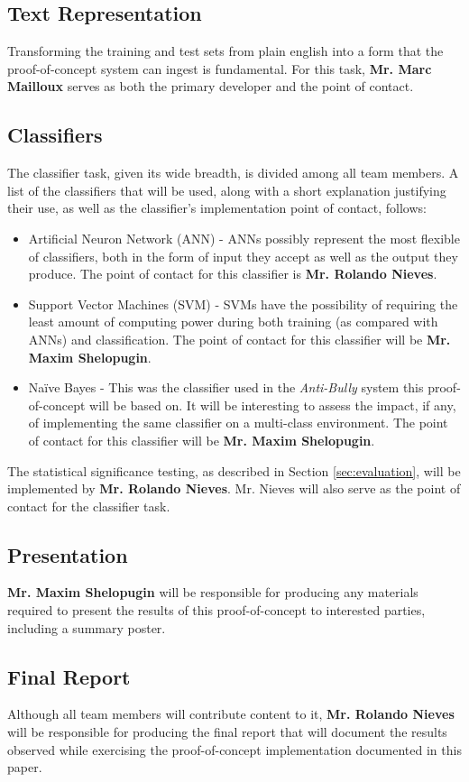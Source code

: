 \documentclass[conference]{sig-alternate-05-2015}
\begin{document}
\subsection{Text Representation}\label{sec:tokenization_task}
Transforming the training and test sets from plain english into a form that the
proof-of-concept system can ingest is fundamental. For this task,
\textbf{Mr. Marc Mailloux} serves as both the primary developer and the
point of contact.

\subsection{Classifiers}\label{sec:classifier_task}
The classifier task, given its wide breadth, is divided among all team
members. A list of the classifiers that will be used, along with a short
explanation justifying their use, as well as the classifier's implementation
point of contact, follows:
\begin{itemize}
  \item Artificial Neuron Network (ANN) - ANNs possibly represent
  the most flexible of classifiers, both in the form of input they accept as
  well as the output they produce. The point of contact for this classifier is
  \textbf{Mr. Rolando Nieves}.
  \item Support Vector Machines (SVM) - SVMs have the possibility of requiring
  the least amount of computing power during both training (as compared with
  ANNs) and classification. The point of contact for this classifier will be
  \textbf{Mr. Maxim Shelopugin}.
  \item Na\"{i}ve Bayes - This was the classifier used in the \textit{Anti-Bully}
  system this proof-of-concept will be based on. It will be interesting to
  assess the impact, if any, of implementing the same classifier on a
  multi-class environment. The point of contact for this classifier will be
  \textbf{Mr. Maxim Shelopugin}.
\end{itemize}

The statistical significance testing, as described in Section
\ref{sec:evaluation}, will be implemented by \textbf{Mr. Rolando Nieves}. Mr.
Nieves will also serve as the point of contact for the classifier task.

\subsection{Presentation}\label{sec:presentation_task}
\textbf{Mr. Maxim Shelopugin} will be responsible for producing any materials
required to present the results of this proof-of-concept to interested parties,
including a summary poster.

\subsection{Final Report}\label{sec:report_task}
Although all team members will contribute content to it,
\textbf{Mr. Rolando Nieves} will be responsible for producing the final report
that will document the results observed while exercising the proof-of-concept
implementation documented in this paper.



\end{document}
